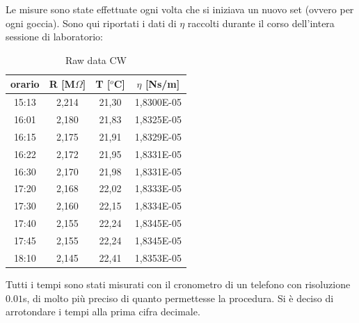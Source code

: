 \documentclass{article}
\begin{document}
        Le misure sono state effettuate ogni volta che si iniziava un nuovo set (ovvero per ogni goccia).
        Sono qui riportati i dati di $\eta$ raccolti durante il corso dell'intera sessione di laboratorio: \\
        \begin{table}[H]
        \centering
            \begin{tabular}{ cccc } 
                \toprule 
                orario & R [M$\Omega$] & T [$^o$C] & $\eta$ [Ns/m] \\
                \midrule 
                15:13 &	2,214	&	21,30	&	1,8300E-05  \\
                16:01 &	2,180	&	21,83	&	1,8325E-05  \\	
                16:15 &	2,175	&	21,91	&	1,8329E-05	\\
                16:22 &	2,172	&	21,95	&	1,8331E-05	\\
                16:30 & 2,170	&	21,98	&	1,8331E-05	\\
                17:20 &	2,168	&	22,02	&	1,8333E-05	\\
                17:30 & 2,160	&   22,15	&	1,8334E-05	\\
                17:40 &	2,155	&	22,24	&	1,8345E-05	\\
                17:45 &	2,155	&	22,24	&	1,8345E-05	\\
                18:10 &	2,145	&	22,41	&	1,8353E-05	\\
                \bottomrule           
            \end{tabular}
            \caption{Raw data CW}
        \end{table}
        Tutti i tempi sono stati misurati con il cronometro di un telefono con risoluzione $0.01$s, di molto più preciso di quanto permettesse la procedura. Si è deciso di arrotondare i tempi alla prima cifra decimale.
\end{document}
